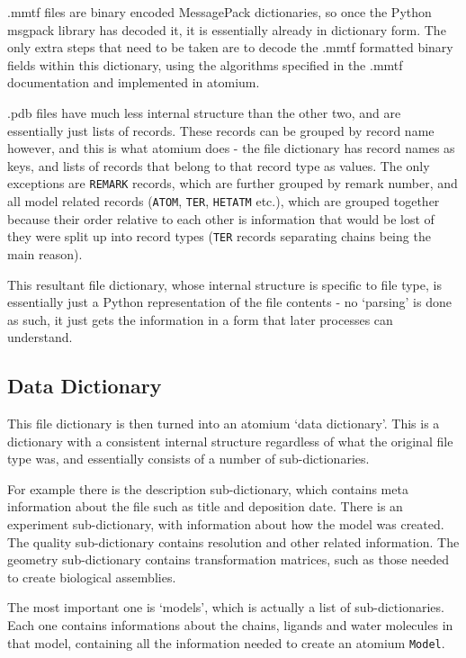 .mmtf files are binary encoded MessagePack  dictionaries, so once the Python msgpack library has decoded it, it is essentially already in dictionary form. The only extra steps that need to be taken are to decode the .mmtf formatted binary fields within this dictionary, using the algorithms specified in the .mmtf documentation and implemented in atomium.

.pdb files have much less internal structure than the other two, and are essentially just lists of records. These records can be grouped by record name however, and this is what atomium does - the file dictionary has record names as keys, and lists of records that belong to that record type as values. The only exceptions are \texttt{REMARK} records, which are further grouped by remark number, and all model related records (\texttt{ATOM}, \texttt{TER}, \texttt{HETATM} etc.), which are grouped together because their order relative to each other is information that would be lost of they were split up into record types (\texttt{TER} records separating chains being the main reason).

This resultant file dictionary, whose internal structure is specific to file type, is essentially just a Python representation of the file contents - no `parsing' is done as such, it just gets the information in a form that later processes can understand.

\subsection{Data Dictionary}

This file dictionary is then turned into an atomium `data dictionary'. This is a dictionary with a consistent internal structure regardless of what the original file type was, and essentially consists of a number of sub-dictionaries.

For example there is the description sub-dictionary, which contains meta information about the file such as title and deposition date. There is an experiment sub-dictionary, with information about how the model was created. The quality sub-dictionary contains resolution and other related information. The geometry sub-dictionary contains transformation matrices, such as those needed to create biological assemblies.

The most important one is `models', which is actually a list of sub-dictionaries. Each one contains informations about the chains, ligands and water molecules in that model, containing all the information needed to create an atomium \texttt{Model}.

